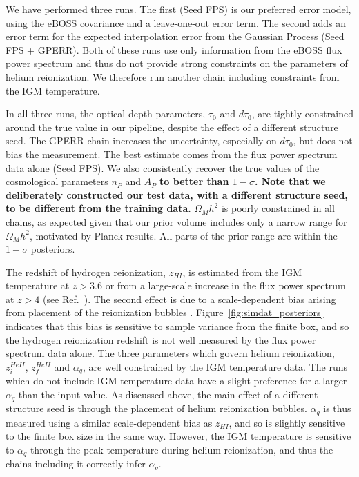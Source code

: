 We have performed three runs.
The first (Seed FPS) is our preferred error model, using the eBOSS covariance and a leave-one-out error term.
The second adds an error term for the expected interpolation error from the Gaussian Process (Seed FPS + GPERR).
Both of these runs use only information from the eBOSS flux power spectrum and thus do not provide strong constraints on the parameters of helium reionization.
We therefore run another chain including constraints from the IGM temperature.

In all three runs, the optical depth parameters, $\tau_0$ and $d\tau_0$, are tightly constrained around the true value in our pipeline, despite the effect of a different structure seed. The GPERR chain increases the uncertainty, especially on $d\tau_0$, but does not bias the measurement.
The best estimate comes from the flux power spectrum data alone (Seed FPS).
We also consistently recover the true values of the cosmological parameters $n_P$ and $A_P$ \textbf{to better than $1-\sigma$. Note that we deliberately constructed our test data, with a different structure seed, to be different from the training data.}
$\Omega_M h^2$ is poorly constrained in all chains, as expected given that our prior volume includes only a narrow range for $\Omega_M h^2$, motivated by Planck results.
All parts of the prior range are within the $1-\sigma$ posteriors.

The redshift of hydrogen reionization, $z_{HI}$, is estimated from the IGM temperature at $z > 3.6$ or from a large-scale increase in the flux power spectrum at $z > 4$ (see Ref.~\cite{2023simsuite}).
The second effect is due to a scale-dependent bias arising from placement of the reionization bubbles \cite{Montero:2019}.
Figure~\ref{fig:simdat_posteriors} indicates that this bias is sensitive to sample variance from the finite box, and so the hydrogen reionization redshift is not well measured by the flux power spectrum data alone.
The three parameters which govern helium reionization, $z_i^{HeII}$, $z_f^{HeII}$ and $\alpha_q$, are well constrained by the IGM temperature data.
The runs which do not include IGM temperature data have a slight preference for a larger $\alpha_q$ than the input value.
As discussed above, the main effect of a different structure seed is through the placement of helium reionization bubbles.
$\alpha_q$ is thus measured using a similar scale-dependent bias as $z_{HI}$, and so is slightly sensitive to the finite box size in the same way.
However, the IGM temperature is sensitive to $\alpha_q$ through the peak temperature during helium reionization, and thus the chains including it correctly infer $\alpha_q$.

